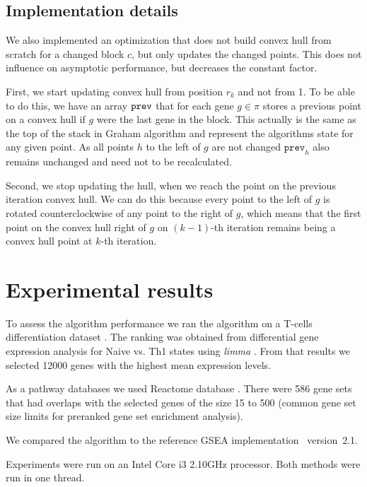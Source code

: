 \documentclass[runningheads,a4paper]{llncs}
\begin{document}
\subsection{Implementation details}

We also implemented an optimization that 
does not build convex hull from scratch for a changed block $c$,
but only updates the changed points. This does not influence on
asymptotic performance, but decreases the constant factor.

First, we start updating convex hull from position $r_k$ and
not from 1. To be able to do this, we have an array $\tt{prev}$ that for
each gene $g \in \pi$ stores a previous point on a convex hull
if $g$ were the last gene in the block. This actually is the same as 
the top of the stack in Graham algorithm and represent
the algorithms state for any given point. 
As all points $h$ to the left of $g$ are not changed $\mathtt{prev}_h$
also remains unchanged and need not to be recalculated.

Second, we stop updating the hull, when we reach the point on the
previous iteration convex hull.
We can do this because every point
to the left of $g$ is rotated counterclockwise of any point to the 
right of $g$, which means that the first point on the convex
hull right of $g$ on $(k-1)$-th iteration remains being a convex hull point
at $k$-th iteration.

\section{Experimental results}\label{section_experiments}

To assess the algorithm performance we ran the algorithm 
on a T-cells differentiation dataset \cite{Wei2009}.
The ranking was obtained from differential gene expression analysis
for Naive vs. Th1 states using \emph{limma} \cite{Ritchie2015}.
From that results we selected 12000 genes with the highest
mean expression levels.

As a pathway databases we used Reactome database \cite{Joshi-Tope2005}.
There were 586 gene sets that had overlaps with the selected genes
of the size 15 to 500 (common gene set size limits for preranked 
gene set enrichment analysis).

We compared the algorithm to the reference GSEA implementation~\cite{Subramanian2005}
version~2.1.

Experiments were run on an Intel Core i3 2.10GHz processor. Both methods
were run in one thread.
\end{document}
